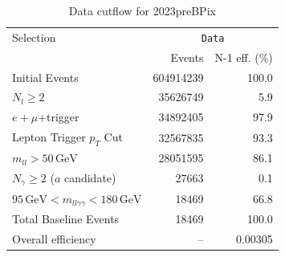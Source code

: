 \begin{table}[htbp]
\centering
\caption{Data cutflow for 2023preBPix}
\label{tab:cutflow-data-2023prebpix}
\footnotesize
\begin{tabular}{lrr}
\hline
Selection & \multicolumn{2}{c}{\texttt{Data}} \\
 & Events & N-1 eff. (\%) \\
\hline
Initial Events & 604914239 & 100.0 \\
$N_{l}\geq 2$ & 35626749 & 5.9 \\
$e+\mu$+trigger & 34892405 & 97.9 \\
Lepton Trigger $p_T$ Cut & 32567835 & 93.3 \\
$m_{ll} > 50\,\mathrm{GeV}$ & 28051595 & 86.1 \\
$N_{\gamma}\geq 2$ ($a$ candidate) & 27663 & 0.1 \\
$95\,\mathrm{GeV} < m_{ll\gamma\gamma} < 180\,\mathrm{GeV}$ & 18469 & 66.8 \\
Total Baseline Events & 18469 & 100.0 \\
\hline
Overall efficiency & -- & 0.00305 \\
\hline
\end{tabular}
\end{table}

